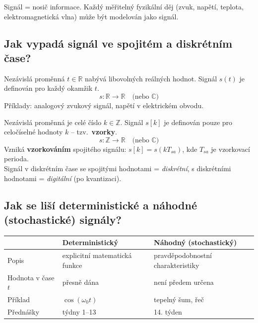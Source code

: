 \documentclass[12pt,a4paper]{article}
\begin{document}
\begin{noteBox}[Intuice]
Signál = nosič informace. Každý měřitelný fyzikální děj (zvuk, napětí, teplota, elektromagnetická vlna) může být modelován jako signál.
\end{noteBox}

\begin{hvezdBox}
\subsection*{Jak vypadá signál ve spojitém a diskrétním čase?}
\end{hvezdBox}

\begin{infoBox}
Nezávislá proměnná $t \in \mathbb{R}$ nabývá libovolných reálných hodnot. Signál $s(t)$ je definován pro každý okamžik $t$.
\[
  s: \mathbb{R} \to \mathbb{R} \quad \text{(nebo } \mathbb{C}\text{)}
\]
Příklady: analogový zvukový signál, napětí v elektrickém obvodu.
\end{infoBox}

\begin{infoBox}
Nezávislá proměnná je celé číslo $k \in \mathbb{Z}$. Signál $s[k]$ je definován pouze pro celočíselné hodnoty $k$ – tzv.\ \textbf{vzorky}.
\[
  s: \mathbb{Z} \to \mathbb{R} \quad \text{(nebo } \mathbb{C}\text{)}
\]
Vzniká \textbf{vzorkováním} spojitého signálu: $s[k] = s(kT_{sa})$, kde $T_{sa}$ je vzorkovací perioda.\\
Signál v diskrétním čase se spojitými hodnotami = \emph{diskrétní}, s diskrétními hodnotami = \emph{digitální} (po kvantizaci).
\end{infoBox}

\subsection*{Jak se liší deterministické a náhodné (stochastické) signály?}

\begin{center}
\begin{tabular}{lll}
\toprule
 & \textbf{Deterministický} & \textbf{Náhodný (stochastický)} \\
\midrule
Popis & explicitní matematická funkce & pravděpodobnostní charakteristiky \\
Hodnota v čase $t$ & přesně dána & není předem určena \\
Příklad & $\cos(\omega_0 t)$ & tepelný šum, řeč \\
Přednášky & týdny 1–13 & 14. týden \\
\bottomrule
\end{tabular}
\end{center}
\end{document}
